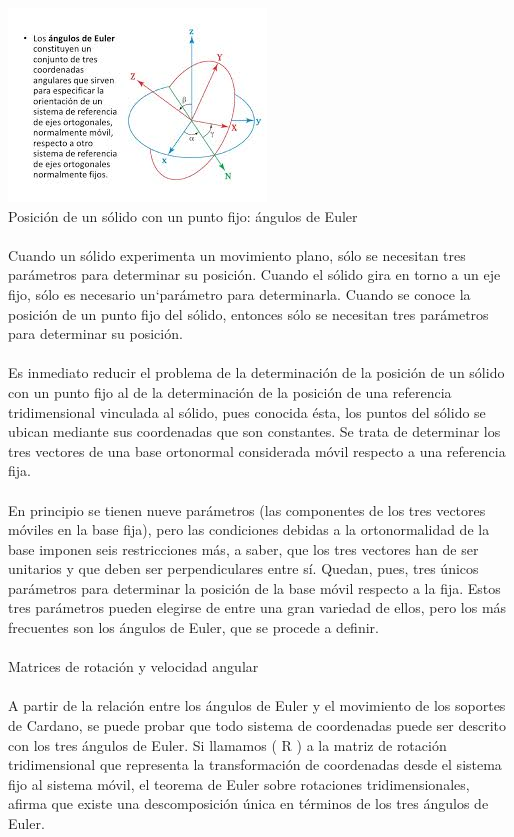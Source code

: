 \documentclass[12pt,a4paper]{article}
\begin{document}
\includegraphics[scale=1.8]{li.jpg} \\
\newpage 
Posición de un sólido con un punto fijo: ángulos de Euler\\\\
Cuando un sólido experimenta un movimiento plano, sólo se necesitan tres parámetros para determinar su posición. Cuando el sólido gira en torno a un eje fijo, sólo es necesario un`parámetro para determinarla. Cuando se conoce la posición de un punto fijo del sólido, entonces sólo se necesitan tres parámetros para determinar su posición.\\\\
Es inmediato reducir el problema de la determinación de la posición de un sólido con un punto fijo al de la determinación de la posición de una referencia tridimensional vinculada al sólido, pues conocida ésta, los puntos del sólido se ubican mediante sus coordenadas que son constantes. Se trata de determinar los tres vectores de una base ortonormal considerada móvil respecto a una referencia fija.\\\\
En principio se tienen nueve parámetros (las componentes de los tres vectores móviles en la base fija), pero las condiciones debidas a la ortonormalidad de la base imponen seis restricciones más, a saber, que los tres vectores han de ser unitarios y que deben ser perpendiculares entre sí. Quedan, pues, tres únicos parámetros para determinar la posición de la base móvil respecto a la fija. Estos tres parámetros pueden elegirse de entre una gran variedad de ellos, pero los más frecuentes son los ángulos de Euler, que se procede a definir.
\\\\
Matrices de rotación y velocidad angular
\\\\
A partir de la relación entre los ángulos de Euler y el movimiento de los soportes de Cardano, se puede probar que todo sistema de coordenadas puede ser descrito con los tres ángulos de Euler. Si llamamos ( R ) a la matriz de rotación tridimensional que representa la transformación de coordenadas desde el sistema fijo al sistema móvil, el teorema de Euler sobre rotaciones tridimensionales, afirma que existe una descomposición única en términos de los tres ángulos de Euler.
\end{document}
